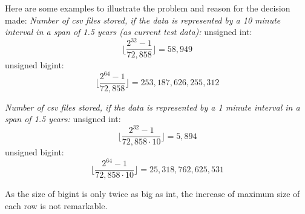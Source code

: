 Here are some examples to illustrate the problem and reason for the decision made:
\textit{Number of csv files stored, if the data is represented by a 10 minute interval in a span of 1.5 years (as current test data):}
\textsf{unsigned int}: 
\begin{equation}
\lfloor \frac{2^{32}-1}{72,858} \rfloor = 58,949
\end{equation}
\textsf{unsigned bigint}:
\begin{equation}
\lfloor \frac{2^{64}-1}{72,858} \rfloor = 253,187,626,255,312
\end{equation}

\textit{Number of csv files stored, if the data is represented by a 1 minute interval in a span of 1.5 years:}
\textsf{unsigned int}:
\begin{equation}
\lfloor \frac{2^{32}-1}{72,858 \cdot 10} \rfloor = 5,894
\end{equation}
\textsf{unsigned bigint}:
\begin{equation}
\lfloor \frac{2^{64}-1}{72,858 \cdot 10} \rfloor = 25,318,762,625,531
\end{equation}

As the size of \textsf{bigint} is only twice as big as \textsf{int}, the increase of maximum size of each row is not remarkable.